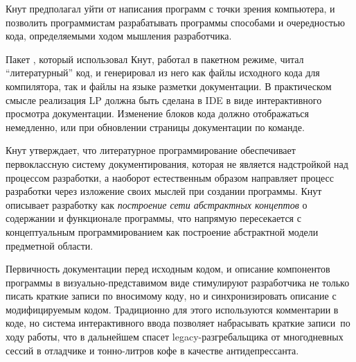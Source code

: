 Кнут предполагал уйти от написания программ с точки зрения компьютера, и
позволить программистам разрабатывать программы способами и очередностью кода,
определяемыми ходом мышления разработчика.

Пакет , который использовал Кнут, работал в пакетном режиме, читал
``литературный'' код, и генерировал из него как файлы исходного кода для
компилятора, так и файлы на языке разметки документации\note{\TeX}.
В практическом смысле реализация LP должна быть сделана в IDE в виде
интерактивного просмотра документации. Изменение блоков кода должно отображаться
немедленно, или при обновлении страницы документации по команде.

Кнут утверждает, что литературное программирование обеспечивает первоклассную
систему документирования, которая не является надстройкой над процессом
разработки, а наоборот естественным образом направляет процесс разработки через
изложение своих мыслей при создании программы. Кнут описывает разработку как
\emph{построение сети абстрактных концептов} о содержании и функционале
программы, что напрямую пересекается с концептуальным программированием
\cite{tyugu} как построение абстрактной модели предметной области.

Первичность документации перед исходным кодом, и описание компонентов программы
в визуально-представимом виде стимулируют разработчика не только писать краткие
записи по вносимому коду, но и синхронизировать описание с модифицируемым кодом.
Традиционно для этого используются комментарии в коде, но система интерактивного
ввода позволяет набрасывать краткие записи\ по ходу
работы, что в дальнейшем спасет legacy-разгребальщика от многодневных сессий в
отладчике и тонно-литров кофе в качестве антидепрессанта.
